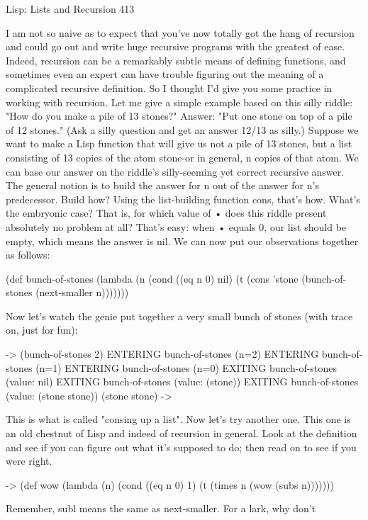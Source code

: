 Lisp: Lists and Recursion                                                            413

        I am not so naive as to expect that you've now totally got the hang of recursion
and could go out and write huge recursive programs with the greatest of ease. Indeed,
recursion can be a remarkably subtle means of defining functions, and sometimes
even an expert can have trouble figuring out the meaning of a complicated recursive
definition. So I thought I'd give you some practice in working with recursion.
Let me give a simple example based on this silly riddle: "How do you make a pile of
13 stones?" Answer: "Put one stone on top of a pile of 12 stones." (Ask a silly
question and get an answer 12/13 as silly.) Suppose we want to make a Lisp function
that will give us not a pile of 13 stones, but a list consisting of 13 copies of the atom
stone-or in general, n copies of that atom. We can base our answer on the riddle's
silly-seeming yet correct recursive answer. The general notion is to build the answer
for n out of the answer for n's predecessor. Build how? Using the list-building
function cons, that's how. What's the embryonic case? That is, for which value of
• does this riddle present absolutely no problem at all? That's easy: when
• equals 0, our list should be empty, which means the answer is nil. We can now put
our observations together as follows:

(def bunch-of-stones (lambda (n
       (cond ((eq n 0) nil)
              (t (cons 'stone (bunch-of-stones (next-smaller n)))))))

Now let's watch the genie put together a very small bunch of stones (with trace on,
just for fun):

-> (bunch-of-stones 2)
       ENTERING bunch-of-stones (n=2)
              ENTERING bunch-of-stones (n=1)
                     ENTERING bunch-of-stones (n=0)
                     EXITING bunch-of-stones (value: nil)
              EXITING bunch-of-stones (value: (stone))
       EXITING bunch-of-stones (value: (stone stone))
(stone stone)
->

        This is what is called "consing up a list". Now let's try another one. This one is
an old chestnut of Lisp and indeed of recursion in general. Look at the definition and
see if you can figure out what it's supposed to do; then read on to see if you were
right.

-> (def wow (lambda (n)
        (cond ((eq n 0) 1)
               (t (times n (wow (subs n)))))))

Remember, subl means the same as next-smaller. For a lark, why don't




